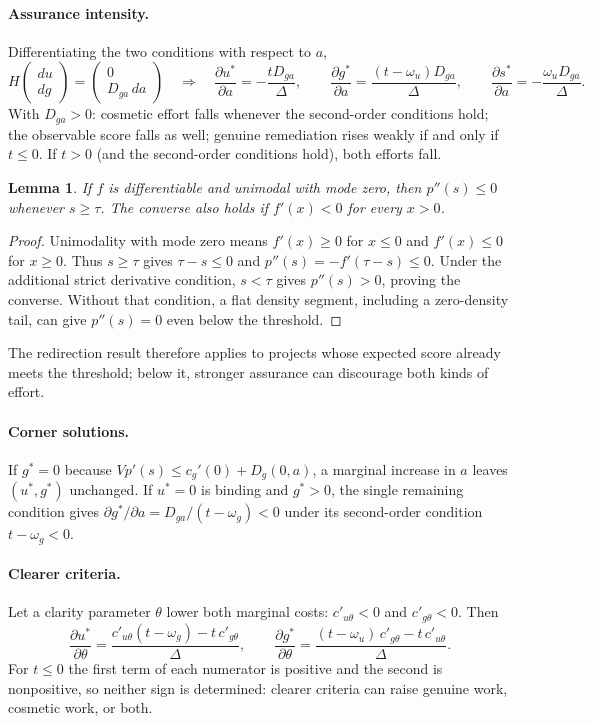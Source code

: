 \documentclass[11pt,a4paper]{article}
\newtheorem{lemma}{Lemma}
\begin{document}
\paragraph{Assurance intensity.} Differentiating the two conditions with respect to $a$,
\[
H\begin{pmatrix}du\\ dg\end{pmatrix}=\begin{pmatrix}0\\ D_{ga}\,da\end{pmatrix}
\quad\Longrightarrow\quad
\frac{\partial u^{*}}{\partial a}=-\frac{tD_{ga}}{\Delta},\qquad
\frac{\partial g^{*}}{\partial a}=\frac{(t-\omega_u)D_{ga}}{\Delta},\qquad
\frac{\partial s^{*}}{\partial a}=-\frac{\omega_uD_{ga}}{\Delta}.
\]
With $D_{ga}>0$: cosmetic effort falls whenever the second-order conditions hold; the observable score
falls as well; genuine remediation rises weakly if and only if $t\le 0$. If $t>0$ (and the
second-order conditions hold), both efforts fall.

\begin{lemma}
If $f$ is differentiable and unimodal with mode zero, then $p''(s)\le 0$ whenever $s\ge\tau$.
The converse also holds if $f'(x)<0$ for every $x>0$.
\end{lemma}
\begin{proof}
Unimodality with mode zero means $f'(x)\ge 0$ for $x\le 0$ and $f'(x)\le 0$ for $x\ge 0$. Thus
$s\ge\tau$ gives $\tau-s\le 0$ and $p''(s)=-f'(\tau-s)\le 0$. Under the additional strict
derivative condition, $s<\tau$ gives $p''(s)>0$, proving the converse. Without that condition,
a flat density segment, including a zero-density tail, can give $p''(s)=0$ even below the threshold.
\end{proof}
The redirection result therefore applies to projects whose expected score already meets the
threshold; below it, stronger assurance can discourage both kinds of effort.

\paragraph{Corner solutions.} If $g^{*}=0$ because $Vp'(s)\le c_g'(0)+D_g(0,a)$, a marginal increase
in $a$ leaves $(u^{*},g^{*})$ unchanged. If $u^{*}=0$ is binding and $g^{*}>0$, the single remaining
condition gives $\partial g^{*}/\partial a=D_{ga}/(t-\omega_g)<0$ under its second-order condition
$t-\omega_g<0$.

\paragraph{Clearer criteria.} Let a clarity parameter $\theta$ lower both marginal costs:
$c'_{u\theta}<0$ and $c'_{g\theta}<0$. Then
\[
\frac{\partial u^{*}}{\partial\theta}=\frac{c'_{u\theta}(t-\omega_g)-t\,c'_{g\theta}}{\Delta},\qquad
\frac{\partial g^{*}}{\partial\theta}=\frac{(t-\omega_u)\,c'_{g\theta}-t\,c'_{u\theta}}{\Delta}.
\]
For $t\le 0$ the first term of each numerator is positive and the second is nonpositive, so neither
sign is determined: clearer criteria can raise genuine work, cosmetic work, or both.
\end{document}
